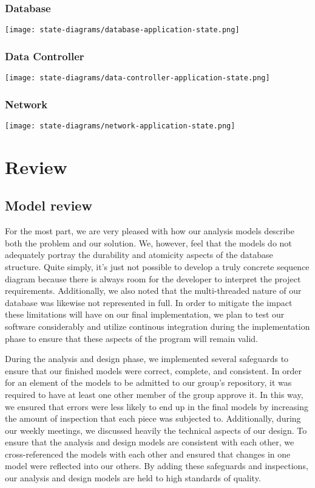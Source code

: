 \documentclass[a4paper]{report}
\begin{document}
	\subsection{Database}
		\texttt{[image: state-diagrams/database-application-state.png]}
	\subsection{Data Controller}
		\texttt{[image: state-diagrams/data-controller-application-state.png]}
	\subsection{Network}
		\texttt{[image: state-diagrams/network-application-state.png]}

\chapter{Review}

\section{Model review}

	For the most part, we are very pleased with how our analysis models describe both the problem and our solution. We, however, feel that the models do not adequately portray the durability and atomicity aspects of the database structure.  Quite simply, it's just not possible to develop a truly concrete sequence diagram because there is always room for the developer to interpret the project requirements. Additionally, we also noted that the multi-threaded nature of our database was likewise not represented in full.  In order to mitigate the impact these limitations will have on our final implementation, we plan to test our software considerably and utilize continous integration during the implementation phase to ensure that these aspects of the program will remain valid.

	During the analysis and design phase, we implemented several safeguards to ensure that our finished models were correct, complete, and consistent. In order for an element of the models to be admitted to our group's repository, it was required to have at least one other member of the group approve it. In this way, we ensured that errors were less likely to end up in the final models by increasing the amount of inspection that each piece was subjected to. Additionally, during our weekly meetings, we discussed heavily the technical aspects of our design. To ensure that the analysis and design models are consistent with each other, we cross-referenced the models with each other and ensured that changes in one model were reflected into our others. By adding these safeguards and inspections, our analysis and design models are held to high standards of quality.
\end{document}
